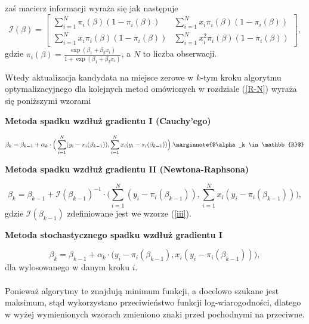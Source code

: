 zaś macierz informacji wyraża się jak następuje
\begin{equation}\label{iii}
\mathscr{I}(\beta) = 
\begin{bmatrix}
    \sum\limits_{i=1}^{N}\pi_i(\beta)(1-\pi_i(\beta))       & \sum\limits_{i=1}^{N}x_i\pi_i(\beta)(1-\pi_i(\beta)) \\
\sum\limits_{i=1}^{N}x_i\pi_i(\beta)(1-\pi_i(\beta)) & \sum\limits_{i=1}^{N}x_i^2\pi_i(\beta)(1-\pi_i(\beta)) 
\end{bmatrix},
\end{equation}
gdzie $\pi_i(\beta) = \frac{\exp(\beta_1+\beta_2x_i)}{1+\exp(\beta_1+\beta_2x_i)}$, a $N$ to liczba obserwacji.

Wtedy aktualizacja kandydata na miejsce zerowe w $k$-tym kroku algorytmu optymalizacyjnego dla kolejnych metod omówionych w rozdziale (\ref{R-N}) wyraża się poniższymi wzorami
\\
\begin{center}
\textbf{Metoda spadku wzdłuż gradientu I (Cauchy’ego)}
\end{center}
\begin{equation*}
\beta_{k} = \beta_{k-1} + \alpha_{k}\cdot\Big(\sum\limits_{i=1}^{N}(y_i-\pi_i(\beta_{k-1})), \sum\limits_{i=1}^{N}x_i(y_i-\pi_i(\beta_{k-1}))\Big).\marginnote{$\alpha_k \in \mathbb{R}$}
\end{equation*}
\begin{center}
\textbf{Metoda spadku wzdłuż gradientu II (Newtona-Raphsona)}
\end{center}
\begin{equation*}
\beta_{k} = \beta_{k-1} + \mathscr{I}(\beta_{k-1})^{-1}\cdot\Big(\sum\limits_{i=1}^{N}(y_i-\pi_i(\beta_{k-1})), \sum\limits_{i=1}^{N}x_i(y_i-\pi_i(\beta_{k-1}))\Big),
\end{equation*}
gdzie $\mathscr{I}(\beta_{k-1})$ zdefiniowane jest we wzorze (\ref{iii}). 
\begin{center}
\textbf{Metoda stochastycznego spadku wzdłuż gradientu I}
\end{center}
\begin{equation*}
\beta_{k} = \beta_{k-1} + \alpha_{k}\cdot\Big(y_i-\pi_i(\beta_{k-1}), x_i(y_i-\pi_i(\beta_{k-1}))\Big),
\end{equation*}
dla wylosowanego w danym kroku $i$.
\\ \ \\
Ponieważ algorytmy te znajdują minimum funkcji, a docelowo szukane jest maksimum, stąd wykorzystano przeciwieństwo funkcji log-wiarogodności, dlatego w wyżej wymienionych wzorach zmieniono znaki przed pochodnymi na przeciwne.

